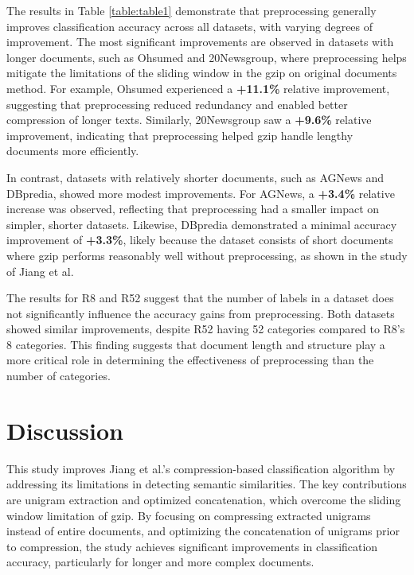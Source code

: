 \documentclass{article}
\begin{document}
The results in Table \ref{table:table1} demonstrate that preprocessing generally improves classification accuracy across all datasets, with varying degrees of improvement. The most significant improvements are observed in datasets with longer documents, such as Ohsumed and 20Newsgroup, where preprocessing helps mitigate the limitations of the sliding window in the gzip on original documents method. For example, Ohsumed experienced a \textbf{+11.1\%} relative improvement, suggesting that preprocessing reduced redundancy and enabled better compression of longer texts. Similarly, 20Newsgroup saw a \textbf{+9.6\%} relative improvement, indicating that preprocessing helped gzip handle lengthy documents more efficiently.

In contrast, datasets with relatively shorter documents, such as AGNews and DBpredia, showed more modest improvements. For AGNews, a \textbf{+3.4\%} relative increase was observed, reflecting that preprocessing had a smaller impact on simpler, shorter datasets. Likewise, DBpredia demonstrated a minimal accuracy improvement of \textbf{+3.3\%}, likely because the dataset consists of short documents where gzip performs reasonably well without preprocessing, as shown in the study of Jiang et al.

The results for R8 and R52 suggest that the number of labels in a dataset does not significantly influence the accuracy gains from preprocessing. Both datasets showed similar improvements, despite R52 having 52 categories compared to R8’s 8 categories. This finding suggests that document length and structure play a more critical role in determining the effectiveness of preprocessing than the number of categories.

\section{Discussion}

This study improves Jiang et al.'s compression-based classification algorithm by addressing its limitations in detecting semantic similarities. The key contributions are unigram extraction and optimized concatenation, which overcome the sliding window limitation of gzip. By focusing on compressing extracted unigrams instead of entire documents, and optimizing the concatenation of unigrams prior to compression, the study achieves significant improvements in classification accuracy, particularly for longer and more complex documents.
\end{document}
